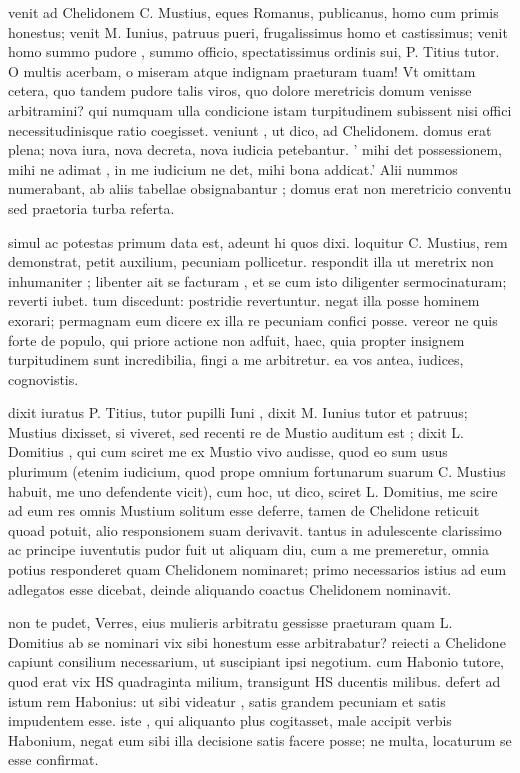  venit ad Chelidonem C. Mustius, eques Romanus, publicanus, homo cum primis honestus; venit M. Iunius, patruus pueri, frugalissimus homo et castissimus; venit homo summo pudore , summo officio, spectatissimus ordinis sui, P. Titius tutor. O multis acerbam, o miseram atque indignam praeturam tuam! Vt omittam cetera, quo tandem pudore talis viros, quo dolore meretricis domum venisse arbitramini? qui numquam ulla condicione istam turpitudinem subissent nisi offici necessitudinisque ratio coegisset. veniunt , ut dico, ad Chelidonem. domus erat plena; nova iura, nova decreta, nova iudicia petebantur. ' mihi det possessionem, mihi ne adimat , in me iudicium ne det, mihi bona addicat.' Alii nummos numerabant, ab aliis tabellae obsignabantur ; domus erat non meretricio conventu sed praetoria turba referta.

 simul ac potestas primum data est, adeunt hi quos dixi. loquitur C. Mustius, rem demonstrat, petit auxilium, pecuniam pollicetur. respondit illa ut meretrix non inhumaniter ; libenter ait se facturam , et se cum isto diligenter sermocinaturam; reverti iubet. tum discedunt: postridie revertuntur. negat illa posse hominem exorari; permagnam eum dicere ex illa re pecuniam confici posse. vereor ne quis forte de populo, qui priore actione non adfuit, haec, quia propter insignem turpitudinem sunt incredibilia, fingi a me arbitretur. ea vos antea, iudices, cognovistis.

 dixit iuratus P. Titius, tutor pupilli Iuni , dixit M. Iunius tutor et patruus; Mustius dixisset, si viveret, sed recenti re de Mustio auditum est ; dixit L. Domitius , qui cum sciret me ex Mustio vivo audisse, quod eo sum usus plurimum (etenim iudicium, quod prope omnium fortunarum suarum C. Mustius habuit, me uno defendente vicit), cum hoc, ut dico, sciret L. Domitius, me scire ad eum res omnis Mustium solitum esse deferre, tamen de Chelidone reticuit quoad potuit, alio responsionem suam derivavit. tantus in adulescente clarissimo ac principe iuventutis pudor fuit ut aliquam diu, cum a me premeretur, omnia potius responderet quam Chelidonem nominaret; primo necessarios istius ad eum adlegatos esse dicebat, deinde aliquando coactus Chelidonem nominavit.

 non te pudet, Verres, eius mulieris arbitratu gessisse praeturam quam L. Domitius ab se nominari vix sibi honestum esse arbitrabatur? reiecti a Chelidone capiunt consilium necessarium, ut suscipiant ipsi negotium. cum Habonio tutore, quod erat vix HS quadraginta milium, transigunt HS ducentis milibus. defert ad istum rem Habonius: ut sibi videatur , satis grandem pecuniam et satis impudentem esse. iste , qui aliquanto plus cogitasset, male accipit verbis Habonium, negat eum sibi illa decisione satis facere posse; ne multa, locaturum se esse confirmat.


